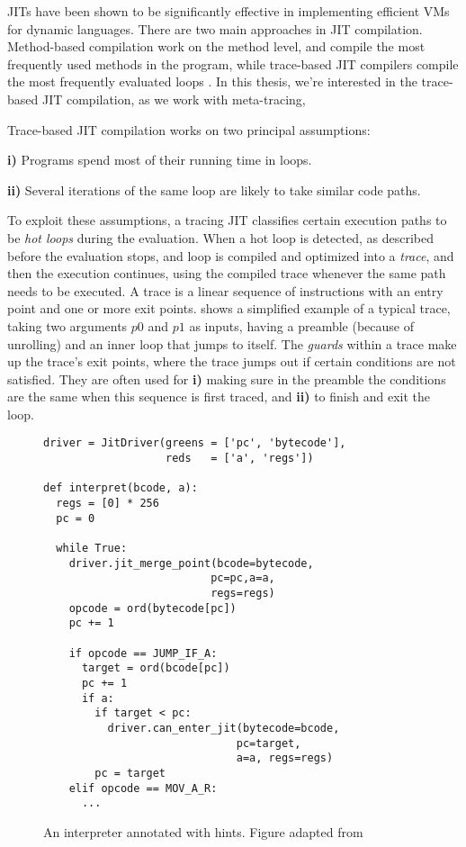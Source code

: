 JITs have been shown to be significantly effective in implementing
efficient VMs for dynamic languages. There are two main approaches in
JIT compilation. Method-based compilation work on the method level,
and compile the most frequently used methods in the program, while
trace-based JIT compilers compile the most frequently evaluated loops
\cite{survey:05,jit-history:03}. In this thesis, we're interested in
the trace-based JIT compilation, as we work with meta-tracing,

Trace-based JIT compilation works on two principal assumptions:

\textbf{i)} Programs spend most of their running time in loops.

\textbf{ii)} Several iterations of the same loop are likely to take
similar code paths.

To exploit these assumptions, a tracing JIT classifies certain
execution paths to be \emph{hot loops} during the evaluation. When a
hot loop is detected, as described before the evaluation stops, and
loop is compiled and optimized into a \emph{trace}, and then the
execution continues, using the compiled trace whenever the same path
needs to be executed. A trace is a linear sequence of instructions
with an entry point and one or more exit points. 
shows a simplified example of a typical trace, taking two arguments
$p0$ and $p1$ as inputs, having a preamble (because of unrolling) and
an inner loop that jumps to itself. The \emph{guards} within a trace
make up the trace's exit points, where the trace jumps out if certain
conditions are not satisfied. They are often used for \textbf{i)}
making sure in the preamble the conditions are the same when this
sequence is first traced, and \textbf{ii)} to finish and exit the
loop.

  \begin{wrapfigure}[20]{r}{0.35\textwidth}
    \centering
    \begin{minipage}[t]{0.32\textwidth}
      \begin{verbatim}
driver = JitDriver(greens = ['pc', 'bytecode'],
                   reds   = ['a', 'regs'])

def interpret(bcode, a):
  regs = [0] * 256
  pc = 0

  while True:
    driver.jit_merge_point(bcode=bytecode,
                          pc=pc,a=a,
                          regs=regs)
    opcode = ord(bytecode[pc])
    pc += 1

    if opcode == JUMP_IF_A:
      target = ord(bcode[pc])
      pc += 1
      if a:
        if target < pc:
          driver.can_enter_jit(bytecode=bcode,
                              pc=target,
                              a=a, regs=regs)
        pc = target
    elif opcode == MOV_A_R:
      ...
    \end{verbatim}
    \end{minipage}
    \caption{\small An interpreter annotated with hints. Figure
      adapted from \cite{bolz09}}
    \label{fig:rpython-interp}
  \end{wrapfigure}

